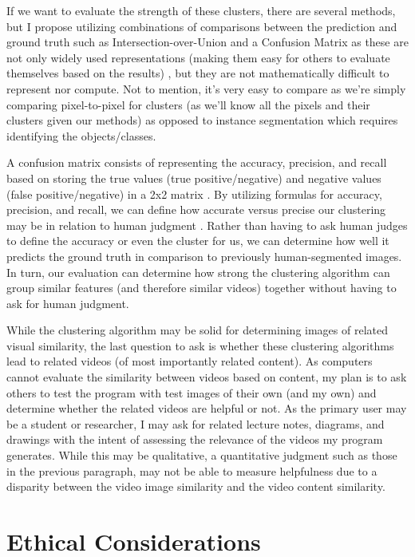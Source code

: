 \documentclass[10pt,twocolumn]{article}
\begin{document}
If we want to evaluate the strength of these clusters, there are several methods, but I propose utilizing combinations of comparisons between the prediction and ground truth such as Intersection-over-Union and a Confusion Matrix as these are not only widely used representations (making them easy for others to evaluate themselves based on the results) \cite{Mittal2021}, but they are not mathematically difficult to represent nor compute. Not to mention, it’s very easy to compare as we’re simply comparing pixel-to-pixel for clusters (as we’ll know all the pixels and their clusters given our methods) as opposed to instance segmentation which requires identifying the objects/classes.

A confusion matrix consists of representing the accuracy, precision, and recall based on storing the true values (true positive/negative) and negative values (false positive/negative) in a 2x2 matrix \cite{Jordan2018}. By utilizing formulas for accuracy, precision, and recall, we can define how accurate versus precise our clustering may be in relation to human judgment \cite{Jordan2018}. Rather than having to ask human judges to define the accuracy or even the cluster for us, we can determine how well it predicts the ground truth in comparison to previously human-segmented images. In turn, our evaluation can determine how strong the clustering algorithm can group similar features (and therefore similar videos) together without having to ask for human judgment.

While the clustering algorithm may be solid for determining images of related visual similarity, the last question to ask is whether these clustering algorithms lead to related videos (of most importantly related content). As computers cannot evaluate the similarity between videos based on content, my plan is to ask others to test the program with test images of their own (and my own) and determine whether the related videos are helpful or not. As the primary user may be a student or researcher, I may ask for related lecture notes, diagrams, and drawings with the intent of assessing the relevance of the videos my program generates. While this may be qualitative, a quantitative judgment such as those in the previous paragraph, may not be able to measure helpfulness due to a disparity between the video image similarity and the video content similarity.

\section {Ethical Considerations}
\end{document}
